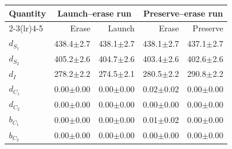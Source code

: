\begingroup
\setlength{\tabcolsep}{3pt}
\begin{tabular}{@{}lrrrr@{}}
\toprule
Quantity & \multicolumn{2}{c}{Launch--erase run} & \multicolumn{2}{c}{Preserve--erase run} \\
\cmidrule(lr){2-3}\cmidrule(lr){4-5}
 & Erase & Launch & Erase & Preserve \\
\midrule
$d_{S_1}$ & 438.4\ensuremath{\pm}2.7 & 438.1\ensuremath{\pm}2.7 & 438.1\ensuremath{\pm}2.7 & 437.1\ensuremath{\pm}2.7 \\
$d_{S_2}$ & 405.2\ensuremath{\pm}2.6 & 404.7\ensuremath{\pm}2.6 & 403.4\ensuremath{\pm}2.6 & 402.6\ensuremath{\pm}2.6 \\
$d_I$ & 278.2\ensuremath{\pm}2.2 & 274.5\ensuremath{\pm}2.1 & 280.5\ensuremath{\pm}2.2 & 290.8\ensuremath{\pm}2.2 \\
$d_{C_1}$ & 0.00\ensuremath{\pm}0.00 & 0.00\ensuremath{\pm}0.00 & 0.02\ensuremath{\pm}0.02 & 0.00\ensuremath{\pm}0.00 \\
$d_{C_2}$ & 0.00\ensuremath{\pm}0.00 & 0.00\ensuremath{\pm}0.00 & 0.00\ensuremath{\pm}0.00 & 0.00\ensuremath{\pm}0.00 \\
$b_{C_1}$ & 0.00\ensuremath{\pm}0.00 & 0.00\ensuremath{\pm}0.00 & 0.01\ensuremath{\pm}0.02 & 0.00\ensuremath{\pm}0.00 \\
$b_{C_2}$ & 0.00\ensuremath{\pm}0.00 & 0.00\ensuremath{\pm}0.00 & 0.00\ensuremath{\pm}0.00 & 0.00\ensuremath{\pm}0.00 \\
\bottomrule
\end{tabular}
\endgroup

